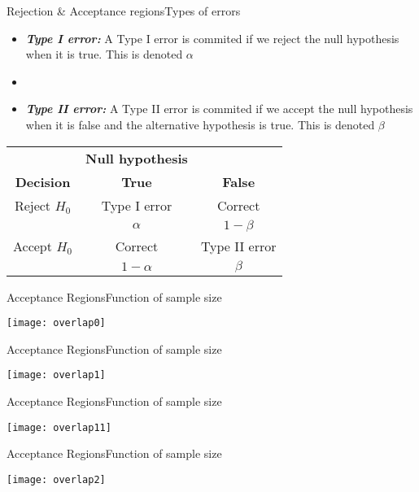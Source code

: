 \documentclass[xcolor=dvipsnames]{beamer}
\begin{document}
\begin{frame}{Rejection \& Acceptance regions}{Types of errors}
	\begin{itemize}
		\item \textbf{\emph{Type I error:}} A Type I error is commited if we reject the null hypothesis when it is true. This is denoted $\alpha$ \pause
		\item[]
		\item \textbf{\emph{Type II error:}} A Type II error is commited if we accept the null hypothesis when it is false and the alternative hypothesis is true. This is denoted $\beta$ \pause
	\end{itemize}
	\begin{center}
		\begin{tabular}{c|cc}
			& \textbf{Null hypothesis} & \\
			\textbf{Decision} & \textbf{True} & \textbf{False} \\ \hline
			Reject $H_0$ & Type I error & Correct \\
			& $\alpha$ & $1-\beta$ \\ \hline
			Accept $H_0$ & Correct & Type II error \\
			& $1-\alpha$ & $\beta$ \\ \hline
		\end{tabular}
	\end{center}
\end{frame}

\begin{frame}{Acceptance Regions}{Function of sample size}
	\begin{center}
		\texttt{[image: overlap0]}
	\end{center}
\end{frame}

\begin{frame}{Acceptance Regions}{Function of sample size}
	\begin{center}
		\texttt{[image: overlap1]}
	\end{center}
\end{frame}

\begin{frame}{Acceptance Regions}{Function of sample size}
	\begin{center}
		\texttt{[image: overlap11]}
	\end{center}
\end{frame}

\begin{frame}{Acceptance Regions}{Function of sample size}
	\begin{center}
		\texttt{[image: overlap2]}
	\end{center}
\end{frame}
\end{document}
